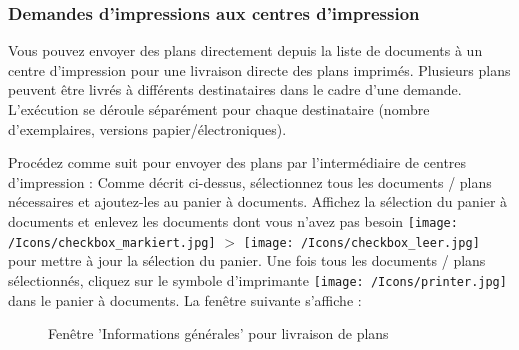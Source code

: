 \subsubsection{Demandes d'impressions aux centres d'impression}
\label{bkm:Ref20170609127}

Vous pouvez envoyer des plans directement depuis la liste de documents à un centre d'impression pour une livraison directe des plans imprimés. Plusieurs plans peuvent être livrés à différents destinataires dans le cadre d'une demande. L'exécution se déroule séparément pour chaque destinataire (nombre d'exemplaires, versions papier/électroniques).

\vspace{\baselineskip}

Procédez comme suit pour envoyer des plans par l'intermédiaire de centres d'impression : Comme décrit ci-dessus, sélectionnez tous les documents / plans nécessaires et ajoutez-les au panier à documents. Affichez la sélection du panier à documents et enlevez les documents dont vous n'avez pas besoin \texttt{[image: /Icons/checkbox\_markiert.jpg]} $ > $ \texttt{[image: /Icons/checkbox\_leer.jpg]} pour mettre à jour la sélection du panier. Une fois tous les documents / plans sélectionnés, cliquez sur le symbole d'imprimante \texttt{[image: /Icons/printer.jpg]} dans le panier à documents. La fenêtre suivante s'affiche :

\begin{figure}[H]
\caption{Fenêtre 'Informations générales' pour livraison de plans}
\end{figure}

